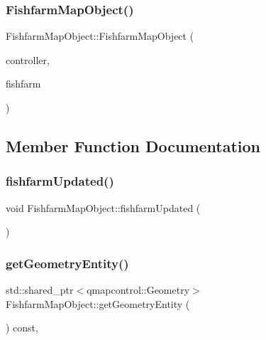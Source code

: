\subsubsection{\texorpdfstring{FishfarmMapObject()}{FishfarmMapObject()}}
{\footnotesize\ttfamily Fishfarm\+Map\+Object\+::\+Fishfarm\+Map\+Object (\begin{DoxyParamCaption}\item[{\mbox{\hyperlink{class_map_objects_controller}{Map\+Objects\+Controller}} $\ast$}]{controller,  }\item[{\mbox{\hyperlink{class_fishfarm_data}{Fishfarm\+Data}} $\ast$}]{fishfarm }\end{DoxyParamCaption})}



\subsection{Member Function Documentation}
\mbox{\label{class_fishfarm_map_object_ab342aa49164996ee9d65c5c903f4acbb}} 
\subsubsection{\texorpdfstring{fishfarmUpdated()}{fishfarmUpdated()}}
{\footnotesize\ttfamily void Fishfarm\+Map\+Object\+::fishfarm\+Updated (\begin{DoxyParamCaption}{ }\end{DoxyParamCaption})}

\mbox{\label{class_fishfarm_map_object_ae5940a46e28dbe1886efd6db689b996a}} 
\subsubsection{\texorpdfstring{getGeometryEntity()}{getGeometryEntity()}}
{\footnotesize\ttfamily std\+::shared\+\_\+ptr$<$qmapcontrol\+::\+Geometry$>$ Fishfarm\+Map\+Object\+::get\+Geometry\+Entity (\begin{DoxyParamCaption}{ }\end{DoxyParamCaption}) const\hspace{0.3cm}{\ttfamily [inline]}, {\ttfamily [virtual]}}



